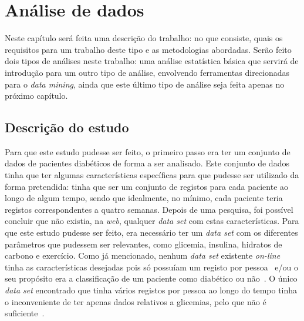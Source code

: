 \chapter{Análise de dados}\label{chap:dese}

Neste capítulo será feita uma descrição do trabalho: no que consiste, quais os requisitos para um trabalho deste tipo e as metodologias abordadas. 
Serão feito dois tipos de análises neste trabalho: uma análise estatística básica que servirá de introdução para um outro tipo de análise, envolvendo ferramentas direcionadas para o \textit{data mining}, ainda que este último tipo de análise seja feita apenas no próximo capítulo.


\section{Descrição do estudo}

Para que este estudo pudesse ser feito, o primeiro passo era ter um conjunto de dados de pacientes diabéticos de forma a ser analisado. Este conjunto de dados tinha que ter algumas características específicas para que pudesse ser utilizado da forma pretendida: tinha que ser um conjunto de registos para cada paciente ao longo de algum tempo, sendo que idealmente, no mínimo, cada paciente teria registos correspondentes a quatro semanas. Depois de uma pesquisa, foi possível concluir que não existia, na \textit{web}, qualquer \textit{data set} com estas características.
Para que este estudo pudesse ser feito, era necessário ter um \textit{data set} com os diferentes parâmetros que pudessem ser relevantes, como glicemia, insulina, hidratos de carbono e exercício. 
Como já mencionado, nenhum \textit{data set} existente \textit{on-line} tinha as características desejadas pois só possuíam um registo por pessoa~\cite{dataset3} e/ou o seu propósito era a classificação de um paciente como diabético ou não~\cite{pima}. O único \textit{data set} encontrado que tinha vários registos por pessoa ao longo do tempo tinha o inconveniente de ter apenas dados relativos a glicemias, pelo que não é suficiente~\cite{dataset2}.

